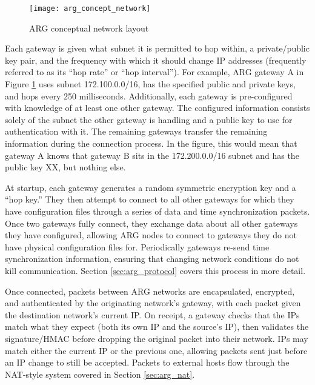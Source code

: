 \begin{figure}
	\centering
	\texttt{[image: arg\_concept\_network]}
	\caption{\ac{ARG} conceptual network layout}
	\label{fig:arg_concept_network}
\end{figure}

\par Each gateway is given what subnet it is permitted to hop within, a private/public key pair, and the frequency with which it should change \ac{IP} addresses (frequently referred to as its ``hop rate'' or ``hop interval''). For example, \ac{ARG} gateway A in Figure \ref{fig:arg_concept_network} uses subnet 172.100.0.0/16, has the specified public and private keys, and hops every 250 milliseconds. Additionally, each gateway is pre-configured with knowledge of at least one other gateway. The configured information consists solely of the subnet the other gateway is handling and a public key to use for authentication with it. The remaining gateways transfer the remaining information during the connection process. In the figure, this would mean that gateway A knows that gateway B sits in the 172.200.0.0/16 subnet and has the public key XX, but nothing else.

\par At startup, each gateway generates a random symmetric encryption key and a ``hop key.'' They then attempt to connect to all other gateways for which they have configuration files through a series of data and time synchronization packets. Once two gateways fully connect, they exchange data about all other gateways they have configured, allowing ARG nodes to connect to gateways they do not have physical configuration files for. Periodically gateways re-send time synchronization information, ensuring that changing network conditions do not kill communication. Section \ref{sec:arg_protocol} covers this process in more detail.

\par Once connected, packets between ARG networks are encapsulated, encrypted, and authenticated by the originating network's gateway, with each packet given the destination network's current IP. On receipt, a gateway checks that the IPs match what they expect (both its own IP and the source's IP), then validates the signature/\ac{HMAC} before dropping the original packet into their network. \acp{IP} may match either the current \ac{IP} or the previous one, allowing packets sent just before an \ac{IP} change to still be accepted. Packets to external hosts flow through the \ac{NAT}-style system covered in Section \ref{sec:arg_nat}. %

